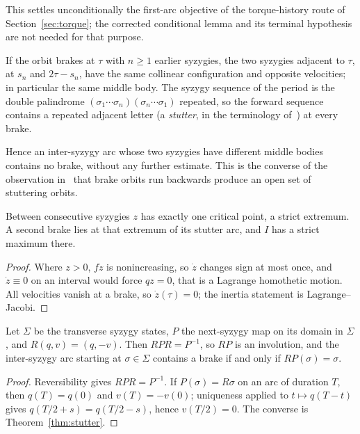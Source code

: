 This settles unconditionally the first-arc objective of the torque-history
route of Section~\ref{sec:torque}; the corrected conditional lemma and its
terminal hypothesis are not needed for that purpose.

\begin{theorem}\label{thm:stutter}
If the orbit brakes at $\tau$ with $n\ge1$ earlier syzygies, the two
syzygies adjacent to $\tau$, at $s_n$ and $2\tau-s_n$, have the same
collinear configuration and opposite velocities; in particular the same
middle body. The syzygy sequence of the period is the double palindrome
$(\sigma_1\cdots\sigma_n)(\sigma_n\cdots\sigma_1)$ repeated, so the forward
sequence contains a repeated adjacent letter (a \emph{stutter}, in the
terminology of~\cite{MMV}) at every brake.
\end{theorem}

Hence an inter-syzygy arc whose two syzygies have different middle bodies
contains no brake, without any further estimate. This is the converse of
the observation in~\cite{MMV} that brake orbits run backwards produce an
open set of stuttering orbits.

\begin{theorem}\label{thm:zmax}
Between consecutive syzygies $z$ has exactly one critical point, a strict
extremum. A second brake lies at that extremum of its stutter arc, and $I$
has a strict maximum there.
\end{theorem}
\begin{proof}
Where $z>0$, $f\dot z$ is nonincreasing, so $\dot z$ changes sign at most
once, and $\dot z\equiv0$ on an interval would force $qz=0$, that is a
Lagrange homothetic motion. All velocities vanish at a brake, so
$\dot z(\tau)=0$; the inertia statement is Lagrange--Jacobi.
\end{proof}

\begin{theorem}\label{thm:involution}
Let $\Sigma$ be the transverse syzygy states, $P$ the next-syzygy map on its
domain in $\Sigma$, and $R(q,v)=(q,-v)$. Then $RPR=P^{-1}$, so $RP$ is an
involution, and the inter-syzygy arc starting at $\sigma\in\Sigma$ contains a
brake if and only if $RP(\sigma)=\sigma$.
\end{theorem}
\begin{proof}
Reversibility gives $RPR=P^{-1}$. If $P(\sigma)=R\sigma$ on an arc of
duration $T$, then $q(T)=q(0)$ and $v(T)=-v(0)$; uniqueness applied to
$t\mapsto q(T-t)$ gives $q(T/2+s)=q(T/2-s)$, hence $v(T/2)=0$. The converse
is Theorem~\ref{thm:stutter}.
\end{proof}

